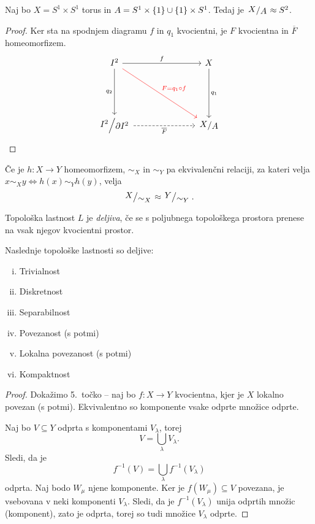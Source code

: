 \begin{zgled}
Naj bo $X = S^1 \times S^1$ torus in
$A = S^1 \times \left\{1\right\} \cup \left\{1\right\} \times S^1$. Tedaj je
$\kvoc{X}{A} \approx S^2$.
\end{zgled}

\begin{proof}
Ker sta na spodnjem diagramu $f$ in $q_1$ kvocientni, je $F$
kvocientna in $\overline{F}$ homeomorfizem.
\[
\begin{tikzcd}[column sep=large, row sep=large]
I^2 \arrow[rr, "f"] \arrow[dd, "q_2"'] \arrow[ddrr, red, "F = q_1 \circ f"] & & X \arrow[dd, "q_1"]\\
\\
\kvoc{I^2}{\partial I^2} \arrow[rr, dashrightarrow, "\overline{F}"'] & & \kvoc{X}{A}
\end{tikzcd} \qedhere
\]
\end{proof}

\begin{opomba}
Če je $h \colon X \to Y$ homeomorfizem, $\sim_X$ in $\sim_Y$ pa
ekvivalenčni relaciji, za kateri velja
$x \sim_X y \iff h(x) \sim_Y h(y)$, velja
\[
\kvoc{X}{\sim_X} \approx \kvoc{Y}{\sim_Y}.
\]
\end{opomba}

\begin{definicija}
Topološka lastnost $L$ je
\emph{deljiva}, če se s
poljubnega topološkega prostora prenese na vsak njegov kvocientni
prostor.
\end{definicija}

\begin{trditev}
Naslednje topološke lastnosti so deljive:

\begin{multicols}{2}
\begin{enumerate}[i)]
\item Trivialnost
\item Diskretnost
\item Separabilnost
\item Povezanost (s potmi)
\item Lokalna povezanost (s potmi)
\item Kompaktnost
\end{enumerate}
\end{multicols}
\end{trditev}

\begin{proof}
Dokažimo 5.~točko -- naj bo $f \colon X \to Y$ kvocientna, kjer je
$X$ lokalno povezan (s potmi). Ekvivalentno so komponente vsake
odprte množice odprte.

Naj bo $V \subseteq Y$ odprta s komponentami $V_\lambda$, torej
\[
V = \bigcup_\lambda  V_\lambda.
\]
Sledi, da je
\[
f^{-1}(V) = \bigcup_\lambda f^{-1}\left( V_\lambda \right)
\]
odprta. Naj bodo $W_\mu$ njene komponente. Ker je
$f(W_\mu) \subseteq V$ povezana, je vsebovana v neki komponenti
$V_\lambda$. Sledi, da je $f^{-1}\left( V_\lambda \right)$ unija
odprtih množic (komponent), zato je odprta, torej so tudi množice
$V_\lambda$ odprte.
\end{proof}

